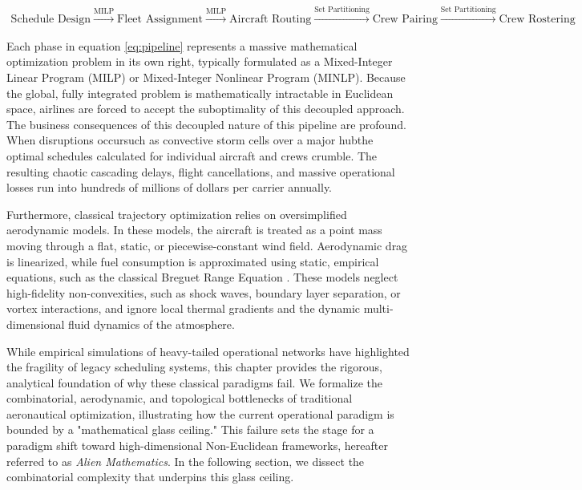 \documentclass[11pt,a4paper]{book}
\begin{document}
\begin{align}
\text{Schedule Design} \xrightarrow{\text{MILP}} \text{Fleet Assignment} \xrightarrow{\text{MILP}} \text{Aircraft Routing} \xrightarrow{\text{Set Partitioning}} \text{Crew Pairing} \xrightarrow{\text{Set Partitioning}} \text{Crew Rostering}
\label{eq:pipeline}
\end{align}

Each phase in equation \eqref{eq:pipeline} represents a massive mathematical optimization problem in its own right, typically formulated as a Mixed-Integer Linear Program (MILP) or Mixed-Integer Nonlinear Program (MINLP). Because the global, fully integrated problem is mathematically intractable in Euclidean space, airlines are forced to accept the suboptimality of this decoupled approach. The business consequences of this decoupled nature of this pipeline are profound. When disruptions occursuch as convective storm cells over a major hubthe optimal schedules calculated for individual aircraft and crews crumble. The resulting chaotic cascading delays, flight cancellations, and massive operational losses run into hundreds of millions of dollars per carrier annually.

Furthermore, classical trajectory optimization relies on oversimplified aerodynamic models. In these models, the aircraft is treated as a point mass moving through a flat, static, or piecewise-constant wind field. Aerodynamic drag is linearized, while fuel consumption is approximated using static, empirical equations, such as the classical Breguet Range Equation \cite{breguet1921}. These models neglect high-fidelity non-convexities, such as shock waves, boundary layer separation, or vortex interactions, and ignore local thermal gradients and the dynamic multi-dimensional fluid dynamics of the atmosphere.

While empirical simulations of heavy-tailed operational networks have highlighted the fragility of legacy scheduling systems, this chapter provides the rigorous, analytical foundation of why these classical paradigms fail. We formalize the combinatorial, aerodynamic, and topological bottlenecks of traditional aeronautical optimization, illustrating how the current operational paradigm is bounded by a "mathematical glass ceiling." This failure sets the stage for a paradigm shift toward high-dimensional Non-Euclidean frameworks, hereafter referred to as \textit{Alien Mathematics}. In the following section, we dissect the combinatorial complexity that underpins this glass ceiling.
\end{document}

